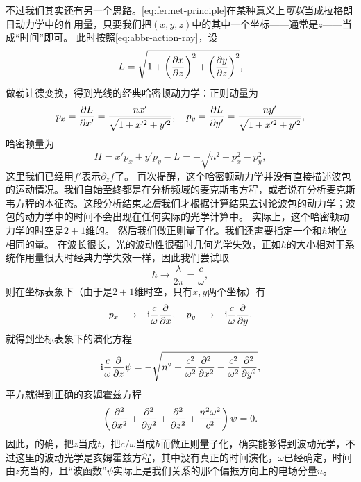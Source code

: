 不过我们其实还有另一个思路。\eqref{eq:fermet-principle}在某种意义上\emph{可以}当成拉格朗日动力学中的作用量，只要我们把$(x, y, z)$中的其中一个坐标——通常是$z$——当成“时间”即可。
此时按照\eqref{eq:abbr-action-ray}，设
\begin{equation}
    L = \sqrt{1 + \left(\pdv{x}{z}\right)^2 + \left(\pdv{y}{z}\right)^2},
\end{equation}
做勒让德变换，得到光线的经典哈密顿动力学：正则动量为
\begin{equation}
    p_x = \pdv{L}{x'} = \frac{n x'}{\sqrt{1 + x'^2 + y'^2}}, \quad p_y = \pdv{L}{y'} = \frac{n y'}{\sqrt{1 + x'^2 + y'^2}},
\end{equation}
哈密顿量为
\begin{equation}
    H = x' p_x + y' p_y - L = - \sqrt{n^2 - p_x^2 - p_y^2} ,
\end{equation}
这里我们已经用$f'$表示$\partial_z f$了。
再次提醒，这个哈密顿动力学并没有直接描述波包的运动情况。我们自始至终都是在分析频域的麦克斯韦方程，或者说在分析麦克斯韦方程的本征态。这段分析结束\emph{之后}我们才根据计算结果去讨论波包的动力学；波包的动力学中的时间不会出现在任何实际的光学计算中。
实际上，这个哈密顿动力学的时空是$2+1$维的。
然后我们做正则量子化。我们还需要指定一个和$\hbar$地位相同的量。
在波长很长，光的波动性很强时几何光学失效，正如$\hbar$的大小相对于系统作用量很大时经典力学失效一样，因此我们尝试取
\begin{equation}
    \hbar \longrightarrow \frac{\lambda}{2 \pi} = \frac{c}{\omega},
\end{equation}
则在坐标表象下（由于是$2+1$维时空，只有$x, y$两个坐标）有
\begin{equation}
    p_x \longrightarrow - \mathrm{i} \frac{c}{\omega} \pdv{x}, \quad p_y \longrightarrow - \mathrm{i} \frac{c}{\omega} \pdv{y},
\end{equation}
就得到坐标表象下的演化方程
\[
    \mathrm{i} \frac{c}{\omega} \pdv{z} \psi = - \sqrt{n^2 + \frac{c^2}{\omega^2} \pdv[2]{x} + \frac{c^2}{\omega^2} \pdv[2]{y}},
\]
平方就得到正确的亥姆霍兹方程
\[
    \left( \pdv[2]{x} + \pdv[2]{y} + \pdv[2]{z} + \frac{n^2 \omega^2}{c^2} \right) \psi = 0.
\]
因此，的确，把$z$当成$t$，把$c/\omega$当成$\hbar$而做正则量子化，确实能够得到波动光学，不过这里的波动光学是亥姆霍兹方程，其中没有真正的时间演化，$\omega$已经确定，时间由$z$充当的，且“波函数”$\psi$实际上是我们关系的那个偏振方向上的电场分量$u$。

